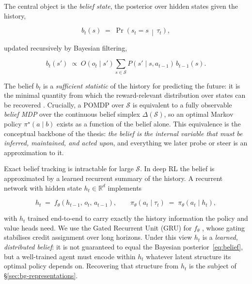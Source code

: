 The central object is the \emph{belief state}, the posterior over hidden states
given the history,

\begin{equation}
    b_t(s) \;=\; \Pr\!\left(s_t = s \,\middle|\, \tau_t\right),
    \label{eq:belief}
\end{equation}

updated recursively by Bayesian filtering,

\begin{equation}
    b_{t}(s') \;\propto\;
        O(o_{t} \mid s')
        \sum_{s \in \mathcal{S}} P(s' \mid s, a_{t-1})\, b_{t-1}(s).
    \label{eq:belief-update}
\end{equation}

The belief $b_t$ is a \emph{sufficient statistic} of the history for predicting
the future: it is the minimal quantity from which the reward-relevant
distribution over states can be recovered \citep{astrom1965optimal}. Crucially,
a POMDP over $\mathcal{S}$ is equivalent to a fully observable
\emph{belief MDP} over the continuous belief simplex $\Delta(\mathcal{S})$, so an
optimal Markov policy $\pi^{\star}(a \mid b)$ exists as a function of the belief
alone. This equivalence is the conceptual backbone of the thesis: \emph{the
belief is the internal variable that must be inferred, maintained, and acted
upon}, and everything we later probe or steer is an approximation to it.

Exact belief tracking is intractable for large $\mathcal{S}$. In deep RL the
belief is approximated by a learned recurrent summary of the history. A
recurrent network with hidden state $h_t \in \mathbb{R}^{d}$ implements

\begin{equation}
    h_t \;=\; f_\theta\!\left(h_{t-1},\, o_t,\, a_{t-1}\right),
    \qquad
    \pi_\theta(a_t \mid \tau_t) \;=\; \pi_\theta(a_t \mid h_t),
    \label{eq:recurrent}
\end{equation}

with $h_t$ trained end-to-end to carry exactly the history information the policy
and value heads need. We use the Gated Recurrent Unit (GRU) for $f_\theta$
\citep{cho2014learning}, whose gating stabilises credit assignment over long
horizons. Under this view $h_t$ is a \emph{learned, distributed belief}: it is
not guaranteed to equal the Bayesian posterior~\eqref{eq:belief}, but a
well-trained agent must encode within $h_t$ whatever latent structure its optimal
policy depends on. Recovering that structure from $h_t$ is the subject of
\S\ref{sec:bg-representations}.

